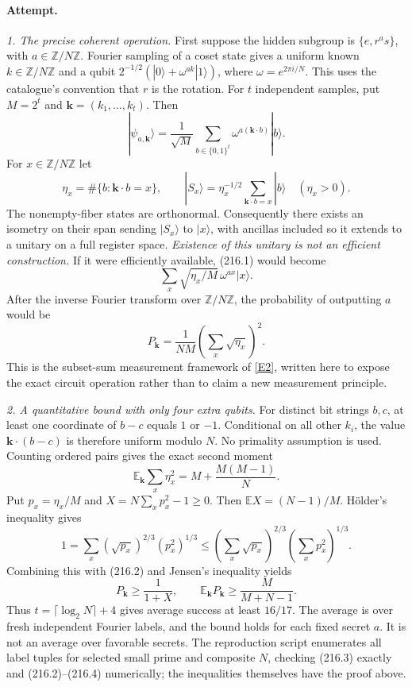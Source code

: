 \documentclass[11pt,a4paper]{article}
\newcommand{\Z}{\mathbb{Z}}
\newcommand{\E}{\mathbb{E}}
\newcommand{\eref}[2]{\hyperlink{extra:#1:#2}{[E#2]}}
\begin{document}
\paragraph{Attempt.}
\textit{1. The precise coherent operation.}
First suppose the hidden subgroup is $\{e,r^a s\}$, with
$a\in\Z/N\Z$. Fourier sampling of a coset state gives a uniform known
$k\in\Z/N\Z$ and a qubit
$2^{-1/2}(|0\rangle+\omega^{ak}|1\rangle)$,
where $\omega=e^{2\pi i/N}$. This uses the catalogue's convention that
$r$ is the rotation. For $t$ independent samples, put $M=2^t$ and
$\mathbf k=(k_1,\ldots,k_t)$. Then
\[
 |\psi_{a,\mathbf k}\rangle
   =\frac1{\sqrt M}\sum_{b\in\{0,1\}^t}
                      \omega^{a(\mathbf k\cdot b)}|b\rangle.
                                                               \tag{216.1}
\]
For $x\in\Z/N\Z$ let
\[
 \eta_x=\#\{b:\mathbf k\cdot b=x\},\qquad
 |S_x\rangle=\eta_x^{-1/2}\sum_{\mathbf k\cdot b=x}|b\rangle
 \quad(\eta_x>0).
\]
The nonempty-fiber states are orthonormal. Consequently there exists an
isometry on their span sending $|S_x\rangle$ to $|x\rangle$, with
ancillas included so it extends to a unitary on a full register space.
\emph{Existence of this unitary is not an efficient construction.}
If it were efficiently available, (216.1) would become
\[
 \sum_x\sqrt{\eta_x/M}\,\omega^{ax}|x\rangle.
\]
After the inverse Fourier transform over $\Z/N\Z$, the probability of
outputting $a$ would be
\[
 P_{\mathbf k}=\frac1{NM}\left(\sum_x\sqrt{\eta_x}\right)^2.
                                                               \tag{216.2}
\]
This is the subset-sum measurement framework of \eref{216}{2}, written
here to expose the exact circuit operation rather than to claim a new
measurement principle.

\textit{2. A quantitative bound with only four extra qubits.}
For distinct bit strings $b,c$, at least one coordinate of $b-c$ equals
$1$ or $-1$. Conditional on all other $k_i$, the value
$\mathbf k\cdot(b-c)$ is therefore uniform modulo $N$. No primality
assumption is used. Counting ordered pairs gives the exact second moment
\[
 \E_{\mathbf k}\sum_x\eta_x^2
       =M+\frac{M(M-1)}N.                                  \tag{216.3}
\]
Put $p_x=\eta_x/M$ and $X=N\sum_xp_x^2-1\ge0$. Then
$\E X=(N-1)/M$. H\"older's inequality gives
\[
 1=\sum_x (\sqrt{p_x})^{2/3}(p_x^2)^{1/3}
 \le\left(\sum_x\sqrt{p_x}\right)^{2/3}
       \left(\sum_xp_x^2\right)^{1/3}.
\]
Combining this with (216.2) and Jensen's inequality yields
\[
 P_{\mathbf k}\ge\frac1{1+X},\qquad
 \E_{\mathbf k}P_{\mathbf k}
       \ge\frac{M}{M+N-1}.                                \tag{216.4}
\]
Thus $t=\lceil\log_2N\rceil+4$ gives average success at least $16/17$.
The average is over fresh independent Fourier labels, and the bound holds
for each fixed secret $a$. It is not an average over favorable secrets.
The reproduction script enumerates all label tuples for selected small
prime and composite $N$, checking (216.3) exactly and (216.2)--(216.4)
numerically; the inequalities themselves have the proof above.
\end{document}
